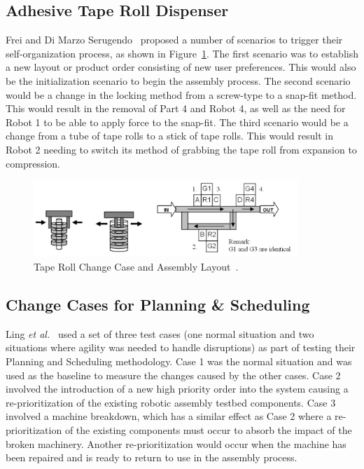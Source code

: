 \subsection{Adhesive Tape Roll Dispenser}
 Frei and Di Marzo Serugendo~\cite{FREI.2008} proposed a number of scenarios to trigger their self-organization process, as shown in Figure~\ref{fig:Tony5}. The first scenario was to establish a new layout or product order consisting of new user preferences. This would also be the initialization scenario to begin the assembly process. The second scenario would be a change in the locking method from a screw-type to a snap-fit method. This would result in the removal of Part 4 and Robot 4, as well as the need for Robot 1 to be able to apply force to the snap-fit. The third scenario would be a change from a tube of tape rolls to a stick of tape rolls. This would result in Robot 2 needing to switch its method of grabbing the tape roll from expansion to compression.
 \begin{figure}[!htb]
\centering
\includegraphics[width=10cm]{Figures/Tony-Fig5.jpg}
\caption{Tape Roll Change Case and Assembly Layout~\cite{FREI.2008}.}
\label{fig:Tony5}
\end{figure}
\subsection{Change Cases for Planning \& Scheduling}
Ling \textit{et al.}~\cite{Ling.1994} used a set of three test cases (one normal situation and two situations where agility was needed to handle disruptions) as part of testing their Planning and Scheduling methodology.  Case 1 was the normal situation and was used as the baseline to measure the changes caused by the other cases. Case 2 involved the introduction of a new high priority order into the system causing a re-prioritization of the existing robotic assembly testbed components. Case 3 involved a machine breakdown, which has a similar effect as Case 2 where a re-prioritization of the existing components must occur to absorb the impact of the broken machinery.  Another re-prioritization would occur when the machine has been repaired and is ready to return to use in the assembly process.
